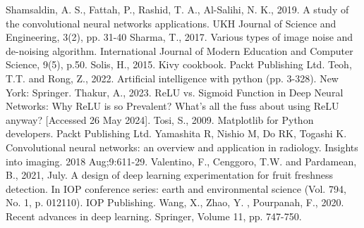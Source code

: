 \documentclass[conference]{IEEEtran}
\begin{document}
\begin{thebibliography}{00}
     Shamsaldin, A. S., Fattah, P., Rashid, T. A., Al-Salihi, N. K., 2019. A study of the convolutional neural networks applications. UKH Journal of Science and Engineering, 3(2), pp. 31-40
     Sharma, T., 2017. Various types of image noise and de-noising algorithm. International Journal of Modern Education and Computer Science, 9(5), p.50.
     Solis, H., 2015. Kivy cookbook. Packt Publishing Ltd.
     Teoh, T.T. and Rong, Z., 2022. Artificial intelligence with python (pp. 3-328). New York: Springer.
     Thakur, A., 2023. ReLU vs. Sigmoid Function in Deep Neural Networks: Why ReLU is so Prevalent? What's all the fuss about using ReLU anyway? [Accessed 26 May 2024].
     Tosi, S., 2009. Matplotlib for Python developers. Packt Publishing Ltd.
     Yamashita R, Nishio M, Do RK, Togashi K. Convolutional neural networks: an overview and application in radiology. Insights into imaging. 2018 Aug;9:611-29.
     Valentino, F., Cenggoro, T.W. and Pardamean, B., 2021, July. A design of deep learning experimentation for fruit freshness detection. In IOP conference series: earth and environmental science (Vol. 794, No. 1, p. 012110). IOP Publishing.
     Wang, X., Zhao, Y. , Pourpanah, F., 2020. Recent advances in deep
    learning. Springer, Volume 11, pp. 747-750.    

\end{thebibliography}
\end{document}
